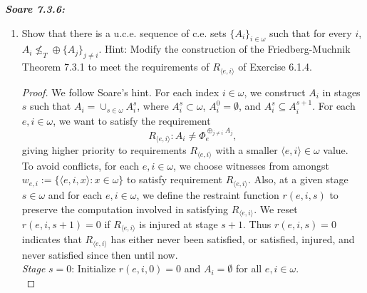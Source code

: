 \documentclass{article}
\begin{document}
\it \textbf{Soare 7.3.6:}
  \begin{enumerate}[label={(\roman*)}]
    \item Show that there is a u.c.e. sequence of c.e. sets
      $\{A_i\}_{i\in\omega}$ such that for every $i$, $A_i\not\leq_T \oplus
      \{A_j\}_{j\neq i}$. Hint: Modify the construction of the
      Friedberg-Muchnik Theorem 7.3.1 to meet the requirements of
      $R_{\langle e,i\rangle}$ of Exercise 6.1.4.

      \begin{proof}
        We follow Soare's hint. For each index $i\in\omega$, we construct
        $A_i$ in stages $s$ such that $A_i=\cup_{s\in\omega}A_i^s$, where
        $A_i^s\subset\omega$, $A_i^0=\emptyset$, and $A_i^s\subseteq
        A_i^{s+1}$. For each $e,i\in\omega$, we want to satisfy the
        requirement \[R_{\langle e,i\rangle}: A_i\neq\Phi_e^{\oplus_{j\neq
        i}A_j},\] giving higher priority to requirements $R_{\langle
        e,i\rangle}$ with a smaller $\langle e,i\rangle\in\omega$ value. \\

        To avoid conflicts, for each $e,i\in\omega$, we choose witnesses
        from amongst $w_{e,i}:=\{\langle e,i,x\rangle: x\in\omega\}$ to
        satisfy requirement $R_{\langle e,i\rangle}$. Also, at a given
        stage $s\in\omega$ and for each $e,i\in\omega$, we define the
        restraint function $r(e,i,s)$ to preserve the computation involved
        in satisfying $R_{\langle e,i\rangle}$. We reset $r(e,i,s+1)=0$ if
        $R_{\langle e,i\rangle}$ is injured at stage $s+1$. Thus
        $r(e,i,s)=0$ indicates that $R_{\langle e,i\rangle}$ has either
        never been satisfied, or satisfied, injured, and never satisfied
        since then until now. \\

        \textit{Stage} $s=0$: Initialize $r(e,i,0)=0$ and $A_i=\emptyset$
        for all $e,i\in\omega$. \\


\end{proof}
\end{enumerate}
\end{document}

